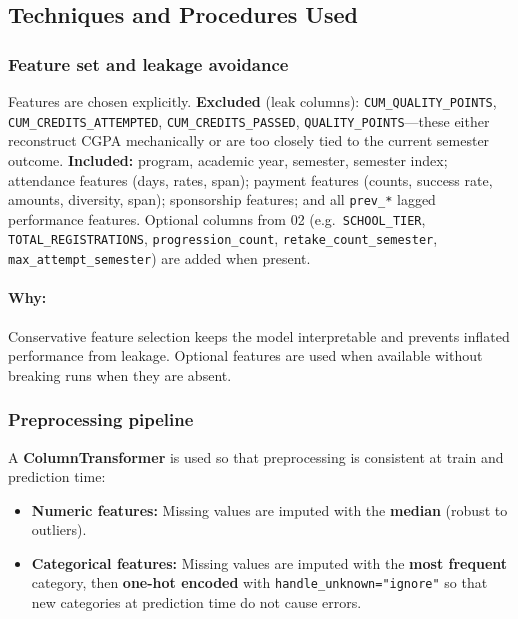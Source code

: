 \documentclass[12pt,a4paper]{article}
\begin{document}
\subsection{Techniques and Procedures Used}

\subsubsection{Feature set and leakage avoidance}

Features are chosen explicitly. \textbf{Excluded} (leak columns): \texttt{CUM\_QUALITY\_POINTS}, \texttt{CUM\_CREDITS\_ATTEMPTED}, \texttt{CUM\_CREDITS\_PASSED}, \texttt{QUALITY\_POINTS}---these either reconstruct CGPA mechanically or are too closely tied to the current semester outcome. \textbf{Included:} program, academic year, semester, semester index; attendance features (days, rates, span); payment features (counts, success rate, amounts, diversity, span); sponsorship features; and all \texttt{prev\_*} lagged performance features. Optional columns from 02 (e.g.\ \texttt{SCHOOL\_TIER}, \texttt{TOTAL\_REGISTRATIONS}, \texttt{progression\_count}, \texttt{retake\_count\_semester}, \texttt{max\_attempt\_semester}) are added when present.

\paragraph{Why:} Conservative feature selection keeps the model interpretable and prevents inflated performance from leakage. Optional features are used when available without breaking runs when they are absent.

\subsubsection{Preprocessing pipeline}

A \textbf{ColumnTransformer} is used so that preprocessing is consistent at train and prediction time:

\begin{itemize}[leftmargin=*]
  \item \textbf{Numeric features:} Missing values are imputed with the \textbf{median} (robust to outliers).
  \item \textbf{Categorical features:} Missing values are imputed with the \textbf{most frequent} category, then \textbf{one-hot encoded} with \texttt{handle\_unknown="ignore"} so that new categories at prediction time do not cause errors.
\end{itemize}
\end{document}
